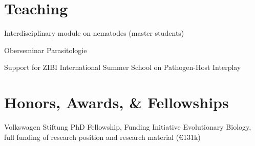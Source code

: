 \documentclass[10pt,a4paper]{article}
\renewenvironment{itemize}{
  \begin{list}{}{
    \setlength{\leftmargin}{2.5em}
    \setlength{\itemsep}{0.25em}
    \setlength{\parskip}{0pt}
    \setlength{\parsep}{0.25em}
  }
}{
  \end{list}
}
\begin{document}
\section*{Teaching}
\begin{itemize}
\item[2013 and 2014] Interdisciplinary module on nematodes (master students)
\item[2012 and 2013]Oberseminar Parasitologie
\item[2012] Support for ZIBI International Summer School on Pathogen-Host
  Interplay
\end{itemize}

\section*{Honors, Awards, \& Fellowships}
\begin{itemize}
\item [2008] Volkswagen Stiftung PhD Fellowship, Funding Initiative
  Evolutionary Biology, full funding of research position and research
  material (\euro 131k)
\end{itemize}



\end{document}
